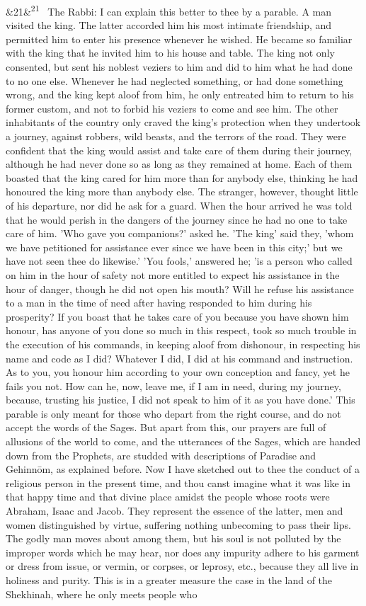 \documentclass[12pt]{article}
\newcommand{\para}[1][]{\par\noindent\ifx&#1&\else\textsuperscript{\footnotesize #1}~\fi}
\begin{document}
\para[21] The Rabbi: I can explain this better to thee by a parable. A man visited the king. The latter accorded him his most intimate friendship, and permitted him to enter his presence whenever he wished. He became so familiar with the king that he invited him to his house and table. The king not only consented, but sent his noblest veziers to him and did to him what he had done to no one else. Whenever he had neglected something, or had done something wrong, and the king kept aloof from him, he only entreated him to return to his former custom, and not to forbid his veziers to come and see him. The other inhabitants of the country only craved the king's protection when they undertook a journey, against robbers, wild beasts, and the terrors of the road. They were confident that the king would assist and take care of them during their journey, although he had never done so as long as they remained at home. Each of them boasted that the king cared for him more than for anybody else, thinking he had honoured the king more than anybody else. The stranger, however, thought little of his departure, nor did he ask for a guard. When the hour arrived he was told that he would perish in the dangers of the journey since he had no one to take care of him. 'Who gave you companions?' asked he. 'The king' said they, 'whom we have petitioned for assistance ever since we have been in this city;' but we have not seen thee do likewise.' 'You fools,' answered he; 'is a person who called on him in the hour of safety not more entitled to expect his assistance in the hour of danger, though he did not open his mouth? Will he refuse his assistance to a man in the time of need after having responded to him during his prosperity? If you boast that he takes care of you because you have shown him honour, has anyone of you done so much in this respect, took so much trouble in the execution of his commands, in keeping aloof from dishonour, in respecting his name and code as I did? Whatever I did, I did at his command and instruction. As to you, you honour him according to your own conception and fancy, yet he fails you not. How can he, now, leave me, if I am in need, during my journey, because, trusting his justice, I did not speak to him of it as you have done.' This parable is only meant for those who depart from the right course, and do not accept the words of the Sages. But apart from this, our prayers are full of allusions of the world to come, and the utterances of the Sages, which are handed down from the Prophets, are studded with descriptions of Paradise and Gehinnōm, as explained before. Now I have sketched out to thee the conduct of a religious person in the present time, and thou canst imagine what it was like in that happy time and that divine place amidst the people whose roots were Abraham, Isaac and Jacob. They represent the essence of the latter, men and women distinguished by virtue, suffering nothing unbecoming to pass their lips. The godly man moves about among them, but his soul is not polluted by the improper words which he may hear, nor does any impurity adhere to his garment or dress from issue, or vermin, or corpses, or leprosy, etc., because they all live in holiness and purity. This is in a greater measure the case in the land of the Shekhinah, where he only meets people who 
\end{document}
